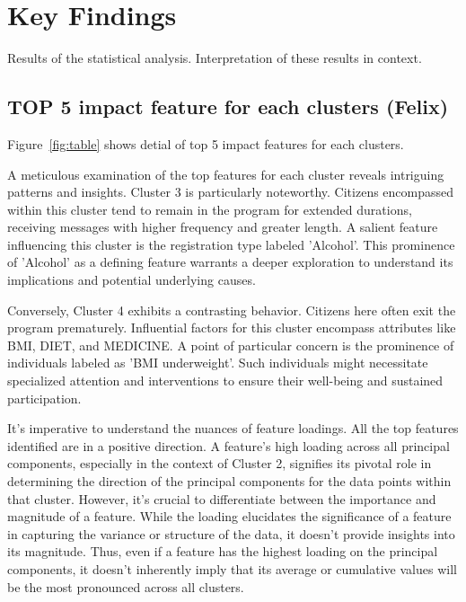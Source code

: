\documentclass[12pt]{article}
\begin{document}
\section{Key Findings}

\label{s.key}

Results of the statistical analysis.
Interpretation of these results in context.

\subsection{TOP 5 impact feature for each clusters (Felix)}

Figure~\ref{fig:table} shows detial of top 5 impact features for each clusters.

A meticulous examination of the top features for each cluster reveals intriguing patterns and insights. Cluster 3 is particularly noteworthy. Citizens encompassed within this cluster tend to remain in the program for extended durations, receiving messages with higher frequency and greater length. A salient feature influencing this cluster is the registration type labeled 'Alcohol'. This prominence of 'Alcohol' as a defining feature warrants a deeper exploration to understand its implications and potential underlying causes.

Conversely, Cluster 4 exhibits a contrasting behavior. Citizens here often exit the program prematurely. Influential factors for this cluster encompass attributes like BMI, DIET, and MEDICINE. A point of particular concern is the prominence of individuals labeled as 'BMI underweight'. Such individuals might necessitate specialized attention and interventions to ensure their well-being and sustained participation.

It's imperative to understand the nuances of feature loadings. All the top features identified are in a positive direction. A feature's high loading across all principal components, especially in the context of Cluster 2, signifies its pivotal role in determining the direction of the principal components for the data points within that cluster. However, it's crucial to differentiate between the importance and magnitude of a feature. While the loading elucidates the significance of a feature in capturing the variance or structure of the data, it doesn't provide insights into its magnitude. Thus, even if a feature has the highest loading on the principal components, it doesn't inherently imply that its average or cumulative values will be the most pronounced across all clusters.
\end{document}
